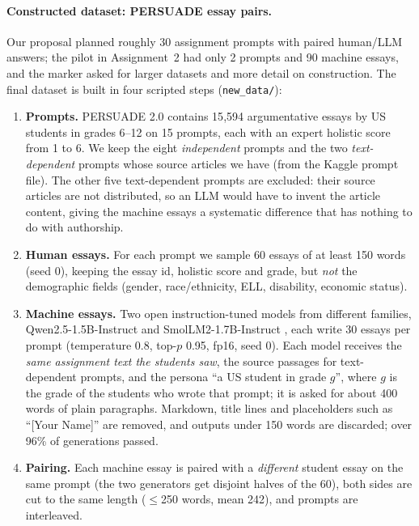 \documentclass[11pt]{article}
\begin{document}
\paragraph{Constructed dataset: PERSUADE essay pairs.} Our proposal planned roughly 30 assignment prompts with paired human/LLM answers; the pilot in Assignment~2 had only 2 prompts and 90 machine essays, and the marker asked for larger datasets and more detail on construction. The final dataset is built in four scripted steps (\texttt{new\_data/}):
\begin{enumerate}\itemsep0pt
\item \textbf{Prompts.} PERSUADE 2.0 \citep{crossley2024persuade} contains 15{,}594 argumentative essays by US students in grades 6--12 on 15 prompts, each with an expert holistic score from 1 to 6. We keep the eight \emph{independent} prompts and the two \emph{text-dependent} prompts whose source articles we have (from the Kaggle prompt file). The other five text-dependent prompts are excluded: their source articles are not distributed, so an LLM would have to invent the article content, giving the machine essays a systematic difference that has nothing to do with authorship.
\item \textbf{Human essays.} For each prompt we sample 60 essays of at least 150 words (seed 0), keeping the essay id, holistic score and grade, but \emph{not} the demographic fields (gender, race/ethnicity, ELL, disability, economic status).
\item \textbf{Machine essays.} Two open instruction-tuned models from different families, Qwen2.5-1.5B-Instruct \citep{qwen2025qwen25} and SmolLM2-1.7B-Instruct \citep{allal2025smollm2}, each write 30 essays per prompt (temperature 0.8, top-$p$ 0.95, fp16, seed 0). Each model receives the \emph{same assignment text the students saw}, the source passages for text-dependent prompts, and the persona ``a US student in grade $g$'', where $g$ is the grade of the students who wrote that prompt; it is asked for about 400 words of plain paragraphs. Markdown, title lines and placeholders such as ``[Your Name]'' are removed, and outputs under 150 words are discarded; over 96\% of generations passed.
\item \textbf{Pairing.} Each machine essay is paired with a \emph{different} student essay on the same prompt (the two generators get disjoint halves of the 60), both sides are cut to the same length ($\le$250 words, mean 242), and prompts are interleaved.
\end{enumerate}
\end{document}
